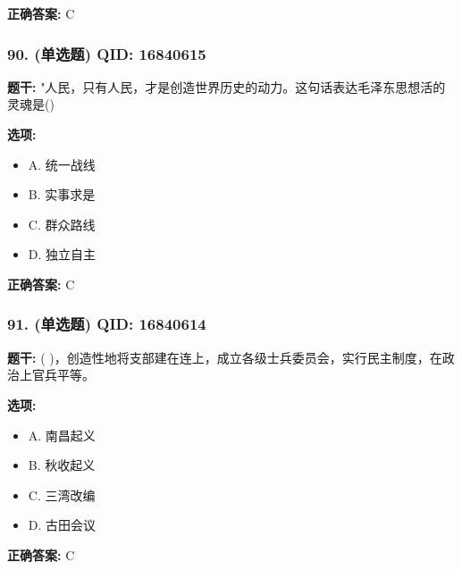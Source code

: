 \documentclass[12pt,UTF8]{ctexart}
\begin{document}
\textbf{正确答案:}
C

\vspace{0.3em}\hrulefill\vspace{0.7em}

\subsubsection*{90. (单选题) \small QID: 16840615}

\textbf{题干:}
"人民，只有人民，才是创造世界历史的动力。这句话表达毛泽东思想活的灵魂是()

\textbf{选项:}
\begin{itemize}[leftmargin=*]

  \item A. 统一战线

  \item B. 实事求是

  \item C. 群众路线

  \item D. 独立自主

\end{itemize}

\textbf{正确答案:}
C

\vspace{0.3em}\hrulefill\vspace{0.7em}

\subsubsection*{91. (单选题) \small QID: 16840614}

\textbf{题干:}
( )，创造性地将支部建在连上，成立各级士兵委员会，实行民主制度，在政治上官兵平等。

\textbf{选项:}
\begin{itemize}[leftmargin=*]

  \item A. 南昌起义

  \item B. 秋收起义

  \item C. 三湾改编

  \item D. 古田会议

\end{itemize}

\textbf{正确答案:}
C

\vspace{0.3em}\hrulefill\vspace{0.7em}
\end{document}
